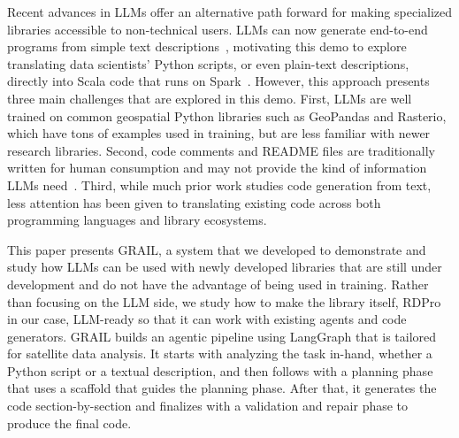 Recent advances in LLMs offer an alternative path forward for making specialized libraries accessible to non-technical users. LLMs can now generate end-to-end programs from simple text descriptions~\cite{trummer2025generating, guo2024deepseek}, motivating this demo to explore translating data scientists' Python scripts, or even plain-text descriptions, directly into Scala code that runs on Spark~\cite{jin2025llms}. However, this approach presents three main challenges that are explored in this demo.
First, LLMs are well trained on common geospatial Python libraries such as GeoPandas and Rasterio, which have tons of examples used in training, but are less familiar with newer research libraries.
Second, code comments and README files are traditionally written for human consumption and may not provide the kind of information LLMs need~\cite{wijaya2025readme}.
Third, while much prior work studies code generation from text, less attention has been given to translating existing code across both programming languages and library ecosystems.




This paper presents GRAIL, a system that we developed to demonstrate and study how LLMs can be used with newly developed libraries that are still under development and do not have the advantage of being used in training.
Rather than focusing on the LLM side, we study how to make the library itself, RDPro~\cite{shang2024rdpro} in our case, LLM-ready so that it can work with existing agents and code generators.
GRAIL builds an agentic pipeline using LangGraph that is tailored for satellite data analysis.
It starts with analyzing the task in-hand, whether a Python script or a textual description, and then follows with a planning phase that uses a scaffold that guides the planning phase. After that, it generates the code section-by-section and finalizes with a validation and repair phase to produce the final code.

